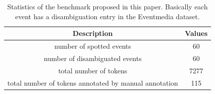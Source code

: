 \documentclass[10pt,a4paper]{article}
\begin{document}
\begin{table}[h]
\centering %
\begin{tabular}{c c } %
\hline %
Description & Values \\ [0.5ex] %
\hline\hline %
number of spotted events & 60  \\
number of disambiguated events & 60  \\
total number of tokens & 7277  \\
total number of tokens annotated by manual annotation & 115  \\
\hline %
\end{tabular}
\caption{Statistics of the benchmark proposed in this paper. Basically each event has a disambiguation entry in the Eventmedia dataset.} %
\label{tab:benchmark} %
\end{table}
\end{document}
